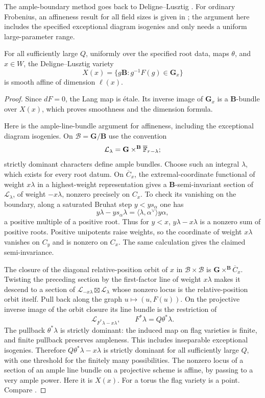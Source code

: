 The ample-boundary method goes back to Deligne--Lusztig
\cite[Sections~9.5--9.7]{DL}.  For ordinary Frobenius, an
affineness result for all field sizes is given in
\cite[Corollary~3.12]{BrosnanHongLee}; the argument here includes
the specified exceptional diagram isogenies and only needs a
uniform large-parameter range.

\begin{lemma}\label{geom:affineness}
For all sufficiently large \(Q\), uniformly over the specified root
data, maps \(\theta\), and \(x\in W\), the Deligne--Lusztig variety
\[
 X(x)=\{g\mathbf B:g^{-1}F(g)\in\mathbf G_x\}
\]
is smooth affine of dimension \(\ell(x)\).
\end{lemma}

\begin{proof}
Since \(dF=0\), the Lang map is \'etale. Its inverse image of
\(\mathbf G_x\) is a \(\mathbf B\)-bundle over \(X(x)\), which proves
smoothness and the dimension formula.

Here is the ample-line-bundle argument for affineness, including the
exceptional diagram isogenies. On \(\mathcal B=\mathbf G/\mathbf B\)
use the convention
\[
 \mathcal L_\lambda=
 \mathbf G\times^{\mathbf B}\overline{\mathbb F}_r{}_{-\lambda};
\]
strictly dominant characters define ample bundles. Choose such an
integral \(\lambda\), which exists for every root datum. On
\(\overline C_x\), the extremal-coordinate functional of weight
\(x\lambda\) in a highest-weight representation gives a
\(\mathbf B\)-semi-invariant section of \(\mathcal L_\lambda\), of
weight \(-x\lambda\), nonzero precisely on \(C_x\). To check its
vanishing on the boundary, along a saturated Bruhat step
\(y<ys_\alpha\) one has
\[
 y\lambda-ys_\alpha\lambda
 =\langle\lambda,\alpha^\vee\rangle y\alpha,
\]
a positive multiple of a positive root. Thus for \(y<x\),
\(y\lambda-x\lambda\) is a nonzero sum of positive roots. Positive
unipotents raise weights, so the coordinate of weight \(x\lambda\)
vanishes on \(C_y\) and is nonzero on \(C_x\). The same calculation
gives the claimed semi-invariance.

The closure of the diagonal relative-position orbit of \(x\) in
\(\mathcal B\times\mathcal B\) is
\(\mathbf G\times^{\mathbf B}\overline C_x\).
Twisting the preceding section by the first-factor line of weight
\(x\lambda\) makes it descend to a section of
\(\mathcal L_{-x\lambda}\boxtimes\mathcal L_\lambda\) whose nonzero
locus is the relative-position orbit itself. Pull back along the graph
\(u\mapsto(u,F(u))\). On the projective inverse image of the orbit
closure its line bundle is the restriction of
\[
 \mathcal L_{F^*\lambda-x\lambda},
 \qquad F^*\lambda=Q\theta^*\lambda.
\]
The pullback \(\theta^*\lambda\) is strictly dominant: the induced
map on flag varieties is finite, and finite pullback preserves
ampleness. This includes inseparable exceptional isogenies. Therefore
\(Q\theta^*\lambda-x\lambda\) is strictly dominant for all
sufficiently large \(Q\), with one threshold for the finitely many
possibilities. The nonzero locus of a section of an ample line bundle
on a projective scheme is affine, by passing to a very ample power.
Here it is \(X(x)\). For a torus the flag variety is a point.
Compare \cite[Sections 9.5--9.7]{DL}.
\end{proof}

